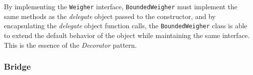 By implementing the \texttt{Weigher} interface, \texttt{BoundedWeigher} must implement the same methods as the \textit{delegate} object passed to the constructor, and by encapsulating the \textit{delegate} object function calls, the \texttt{BoundedWeigher} class is able to extend the default behavior of the object while maintaining the same interface. This is the essence of the \textit{Decorator} pattern.

\subsubsection{Bridge}


